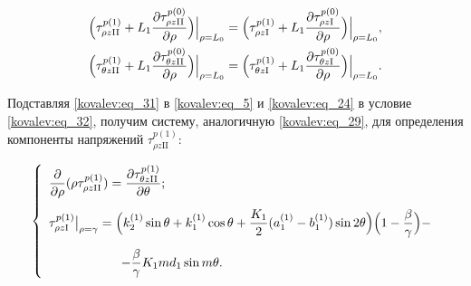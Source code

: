 \begin{gather}

\label{kovalev:eq_32}

  \Bigl(\tau_{\rho z\mathrm{II}}^{p(1)}+L_1\dfrac{\partial\tau_{\rho z\mathrm{II}}^{p(0)}}{\partial\rho}\Bigr)\Bigr|_{\rho=L_0}=

\Bigl(\tau_{\rho z\mathrm{I}}^{p(1)}+L_1\dfrac{\partial\tau_{\rho z\mathrm{I}}^{p(0)}}{\partial\rho}\Bigr)\Bigr|_{\rho=L_0},

\\

\label{kovalev:eq_33}

  \Bigl(\tau_{\theta z\mathrm{II}}^{p(1)}+L_1\dfrac{\partial\tau_{\theta z\mathrm{II}}^{p(0)}}{\partial\rho}\Bigr)\Bigr|_{\rho=L_0}=

\Bigl(\tau_{\theta z\mathrm{I}}^{p(1)}+L_1\dfrac{\partial\tau_{\theta z\mathrm{I}}^{p(0)}}{\partial\rho}\Bigr)\Bigr|_{\rho=L_0}.

\end{gather}







Подставляя \eqref{kovalev:eq_31} в \eqref{kovalev:eq_5} и \eqref{kovalev:eq_24} в условие \eqref{kovalev:eq_32}, получим систему, аналогичную \eqref{kovalev:eq_29}, для определения компоненты напряжений $\tau_{\rho z\mathrm{II}}^{p(1)}$:

 \begin{equation}

\label{kovalev:eq_34}

  \left\{

  \begin{array}{l}

    \dfrac{\partial}{\partial\rho}(\rho\tau_{\rho z\mathrm{II}}^{p(1)})=\dfrac{\partial\tau_{\theta z\mathrm{II}}^{p(1)}}{\partial\theta} ;\\[5mm]

\tau_{\rho z\mathrm{I}}^{p(1)}\bigr|_{\rho=\gamma} =

    \Bigl(k_2^{(1)}\sin\theta+k_1^{(1)}\cos\theta+\dfrac{K_1}{2}(a_1^{(1)}-b_1^{(1)})\sin2\theta\Bigr)

    \Bigl(1-\dfrac{\beta}{\gamma}\Bigr)-\\[5mm]

    \hspace*{20mm}-\dfrac{\beta}{\gamma}K_1md_1\sin m\theta.

  \end{array}

  \right.

 \end{equation}

